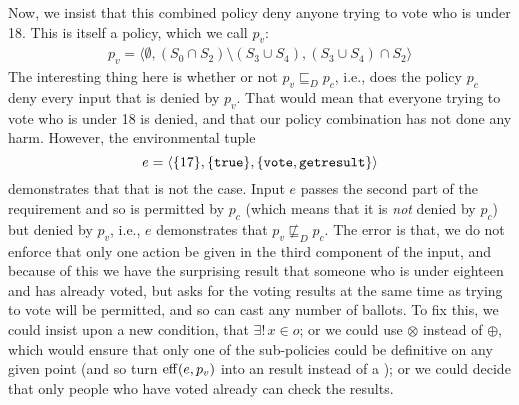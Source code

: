 Now, we insist that this combined policy deny anyone trying to vote
who is under 18.  This is itself a policy, which we call $p_v$:
\begin{align*}
  p_v = \langle \emptyset, (S_0 \cap S_2) \setminus (S_3 \cup S_4),
  (S_3 \cup S_4) \cap S_2 \rangle
\end{align*}
The interesting thing here is whether or not $p_v \sqsubseteq_D p_c$,
i.e., does the policy $p_c$ deny every input that is denied by $p_v$.
That would mean that everyone trying to vote who is under 18 is
denied, and that our policy combination has not done any harm.
However, the environmental tuple \[e = \langle \{17\}, \{\text{\texttt{true}}\},
\{\text{\texttt{vote}}, \text{\texttt{getresult}} \} \rangle\] demonstrates that that is
not the case.  Input $e$ passes the second part of the \Permit{}
requirement and so is permitted by $p_c$ (which means that it is {\em
  not} denied by $p_c$) but denied by $p_v$, i.e., $e$ demonstrates
that $p_v \not \sqsubseteq_D p_c$.  The error is that, we do not
enforce that only one action be given in the third component of the
input, and because of this we have the surprising result that someone
who is under eighteen and has already voted, but asks for the voting
results at the same time as trying to vote will be permitted, and so
can cast any number of ballots.  To fix this, we could insist upon a
new condition, that $\exists ! \, x \in o$; or we could use $\otimes$
instead of $\oplus$, which would ensure that only one of the
sub-policies could be definitive on any given point (and so turn $\operatorname{eff}
(e, p_v)$ into an \Indeterminate{} result instead of a \Permit{}); or we
could decide that only people who have voted already can check the
results.


